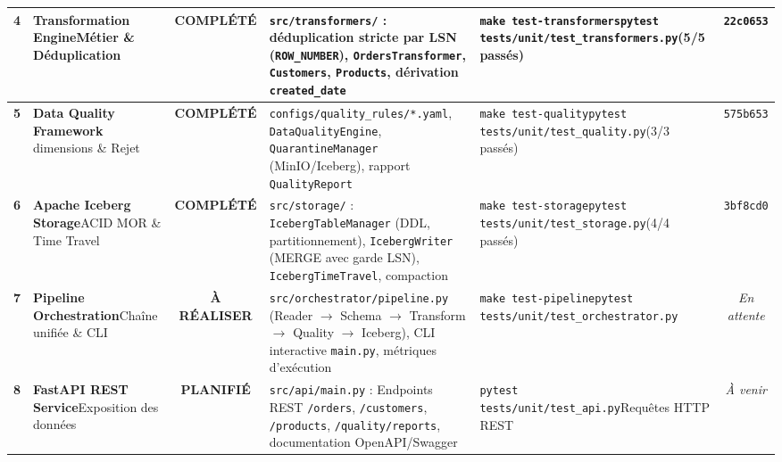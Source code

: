 \documentclass[9pt,a4paper,landscape]{article}
\begin{document}
\begin{tabularx}{\textwidth}{c p{3.2cm} c p{8.6cm} p{5.6cm} c}
\midrule
\textbf{4} & \textbf{Transformation Engine}\newline Métier \& Déduplication & \cellcolor{successbg}\color{successtext}\textbf{COMPLÉTÉ} & \texttt{src/transformers/} : déduplication stricte par LSN (\texttt{ROW\_NUMBER}), \texttt{OrdersTransformer}, \texttt{Customers}, \texttt{Products}, dérivation \texttt{created\_date} & \texttt{make test-transformers}\newline\texttt{pytest tests/unit/test\_transformers.py}\newline(5/5 passés) & \texttt{22c0653} \\
\midrule
\textbf{5} & \textbf{Data Quality Framework}\newline 5 dimensions \& Rejet & \cellcolor{successbg}\color{successtext}\textbf{COMPLÉTÉ} & \texttt{configs/quality\_rules/*.yaml}, \texttt{DataQualityEngine}, \texttt{QuarantineManager} (MinIO/Iceberg), rapport \texttt{QualityReport} & \texttt{make test-quality}\newline\texttt{pytest tests/unit/test\_quality.py}\newline(3/3 passés) & \texttt{575b653} \\
\midrule
\textbf{6} & \textbf{Apache Iceberg Storage}\newline ACID MOR \& Time Travel & \cellcolor{successbg}\color{successtext}\textbf{COMPLÉTÉ} & \texttt{src/storage/} : \texttt{IcebergTableManager} (DDL, partitionnement), \texttt{IcebergWriter} (MERGE avec garde LSN), \texttt{IcebergTimeTravel}, compaction & \texttt{make test-storage}\newline\texttt{pytest tests/unit/test\_storage.py}\newline(4/4 passés) & \texttt{3bf8cd0} \\
\midrule
\textbf{7} & \textbf{Pipeline Orchestration}\newline Chaîne unifiée \& CLI & \cellcolor{warningbg}\color{warningtext}\textbf{À RÉALISER} & \texttt{src/orchestrator/pipeline.py} (Reader $\to$ Schema $\to$ Transform $\to$ Quality $\to$ Iceberg), CLI interactive \texttt{main.py}, métriques d'exécution & \texttt{make test-pipeline}\newline\texttt{pytest tests/unit/test\_orchestrator.py} & \textit{En attente} \\
\midrule
\textbf{8} & \textbf{FastAPI REST Service}\newline Exposition des données & \cellcolor{futurebg}\color{futuretext}\textbf{PLANIFIÉ} & \texttt{src/api/main.py} : Endpoints REST \texttt{/orders}, \texttt{/customers}, \texttt{/products}, \texttt{/quality/reports}, documentation OpenAPI/Swagger & \texttt{pytest tests/unit/test\_api.py}\newline Requêtes HTTP REST & \textit{À venir} \\

\end{tabularx}
\end{document}
